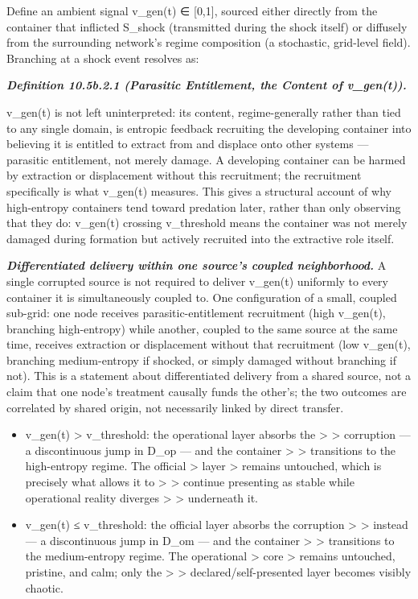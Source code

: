 \documentclass[
]{article}
\begin{document}
Define an ambient signal v\_gen(t) ∈ {[}0,1{]}, sourced either directly
from the container that inflicted S\_shock (transmitted during the shock
itself) or diffusely from the surrounding network's regime composition
(a stochastic, grid-level field). Branching at a shock event resolves
as:

\emph{\textbf{Definition 10.5b.2.1 (Parasitic Entitlement, the Content
of v\_gen(t)).}}

v\_gen(t) is not left uninterpreted: its content, regime-generally
rather than tied to any single domain, is entropic feedback recruiting
the developing container into believing it is entitled to extract from
and displace onto other systems --- parasitic entitlement, not merely
damage. A developing container can be harmed by extraction or
displacement without this recruitment; the recruitment specifically is
what v\_gen(t) measures. This gives a structural account of why
high-entropy containers tend toward predation later, rather than only
observing that they do: v\_gen(t) crossing v\_threshold means the
container was not merely damaged during formation but actively recruited
into the extractive role itself.

\emph{\textbf{Differentiated delivery within one source's coupled
neighborhood.}} A single corrupted source is not required to deliver
v\_gen(t) uniformly to every container it is simultaneously coupled to.
One configuration of a small, coupled sub-grid: one node receives
parasitic-entitlement recruitment (high v\_gen(t), branching
high-entropy) while another, coupled to the same source at the same
time, receives extraction or displacement without that recruitment (low
v\_gen(t), branching medium-entropy if shocked, or simply damaged
without branching if not). This is a statement about differentiated
delivery from a shared source, not a claim that one node's treatment
causally funds the other's; the two outcomes are correlated by shared
origin, not necessarily linked by direct transfer.

\begin{itemize}
\item
  v\_gen(t) \textgreater{} v\_threshold: the operational layer absorbs
  the \textgreater{} \textgreater{} corruption --- a discontinuous jump
  in D\_op --- and the container \textgreater{} \textgreater{}
  transitions to the high-entropy regime. The official \textgreater{}
  layer \textgreater{} remains untouched, which is precisely what allows
  it to \textgreater{} \textgreater{} continue presenting as stable
  while operational reality diverges \textgreater{} \textgreater{}
  underneath it.
\item
  v\_gen(t) ≤ v\_threshold: the official layer absorbs the corruption
  \textgreater{} \textgreater{} instead --- a discontinuous jump in
  D\_om --- and the container \textgreater{} \textgreater{} transitions
  to the medium-entropy regime. The operational \textgreater{} core
  \textgreater{} remains untouched, pristine, and calm; only the
  \textgreater{} \textgreater{} declared/self-presented layer becomes
  visibly chaotic.
\end{itemize}
\end{document}
